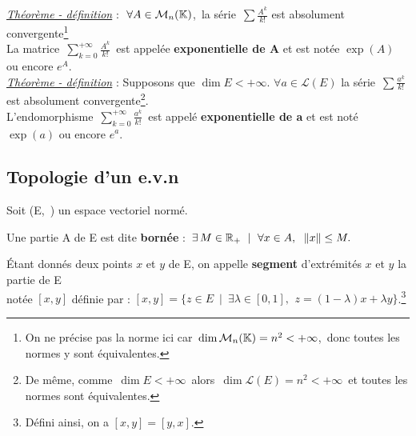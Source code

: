 \vspace{1.3cm}

\underline{\emph{Théorème - définition}} : \(\ \forall A\in \mathcal{M}_n(\KK) \),\, la série \(\,\displaystyle \sum \frac{A^k}{k!} \) est absolument convergente\footnote{On ne précise pas la norme ici car \(\,\dim \mathcal{M}_n(\mathbb{K})=n^2<+\infty\),\, donc toutes les normes y sont équivalentes.}\\
La matrice \(\,\displaystyle \sum_{k=0}^{+\infty}\frac{A^k}{k!}\,\) est appelée \textbf{exponentielle de A} et est notée \(\exp (A)\) ou encore \(e^A\).\vspace{0.3cm}\\

\underline{\emph{Théorème - définition}} : Supposons que \(\dim E<+\infty\). \(\forall a\in \mathscr{L}(E)\) la série \(\,\displaystyle \sum \frac{a^k}{k!}\,\) est absolument convergente\footnote{De même, comme \(\,\dim E <+\infty\,\) alors \(\,\dim \mathscr{L}(E)=n^2 < +\infty\,\) et toutes les normes sont équivalentes.}.\\
L'endomorphisme \(\,\displaystyle \sum_{k=0}^{+\infty}\frac{a^k}{k!}\, \) est appelé \textbf{exponentielle de a} et est noté \(\exp(a)\) ou encore \(e^a\).

\vspace{2cm}

\subsection{Topologie d'un e.v.n}

\vspace{0.7cm}
\begin{center}
    Soit (E,\ \normtxt{\ }) un espace vectoriel normé.
\end{center}

\vspace{1cm}

Une partie A de E est dite \textbf{bornée} \ssi : \(\, \exists\,M\in \mathbb{R}_+ \ \mid \ \forall x\in A,\ \; \left\lVert x\right\rVert\leq M.\)

\vspace{1.3cm}

Étant donnés deux points $x$ et $y$ de E, on appelle \textbf{segment} d'extrémités $x$ et $y$ la partie de E\vspace{0.1cm}\\
notée \([x,y]\) définie par :
\([x,y]=\bigl\{z\in E\ \;\vert \ \; \exists \lambda \in [0,1], \ \, z=(1-\lambda )x + \lambda y \bigr\} \).\footnote{Défini ainsi, on a \([x,y] = [y,x]\).}

